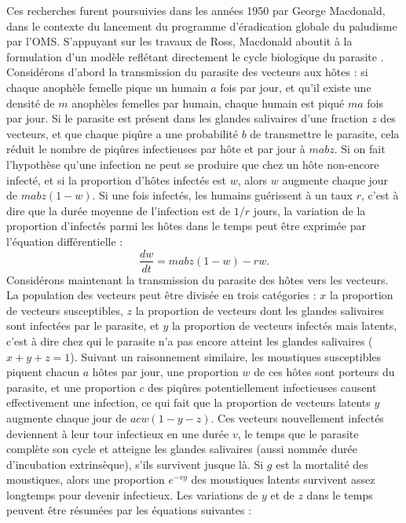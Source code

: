 Ces recherches furent poursuivies dans les années 1950 par George Macdonald, dans le contexte du lancement du programme d'éradication globale du paludisme par l'OMS.
S'appuyant sur les travaux de Ross, Macdonald aboutit à la formulation d'un modèle reflétant directement le cycle biologique du parasite \cite{macdonald1952analysis,koella1991use}.
Considérons d'abord la transmission du parasite des vecteurs aux hôtes : si chaque anophèle femelle pique un humain $a$ fois par jour, et qu'il existe une densité de $m$ anophèles femelles par humain, chaque humain est piqué $ma$ fois par jour.
Si le parasite est présent dans les glandes salivaires d'une fraction $z$ des vecteurs, et que chaque piqûre a une probabilité $b$ de transmettre le parasite, cela réduit le nombre de piqûres infectieuses par hôte et par jour à $mabz$.
Si on fait l'hypothèse qu'une infection ne peut se produire que chez un hôte non-encore infecté, et si la proportion d'hôtes infectés est $w$, alors $w$ augmente chaque jour de $mabz(1-w)$.
Si une fois infectés, les humains guérissent à un taux $r$, c'est à dire que la durée moyenne de l'infection est de $1/r$ jours, la variation de la proportion d'infectés parmi les hôtes dans le temps peut être exprimée par l'équation différentielle :
\begin{equation}
\label{eq:eqRM1}
\frac{dw}{dt} = mabz(1-w) - rw.
\end{equation}
Considérons maintenant la transmission du parasite des hôtes vers les vecteurs.
La population des vecteurs peut être divisée en trois catégories : $x$ la proportion de vecteurs susceptibles, $z$ la proportion de vecteurs dont les glandes salivaires sont infectées par le parasite, et $y$ la proportion de vecteurs infectés mais latents, c'est à dire chez qui le parasite n'a pas encore atteint les glandes salivaires ($x+y+z=1$).
Suivant un raisonnement similaire, les moustiques susceptibles piquent chacun $a$ hôtes par jour, une proportion $w$ de ces hôtes sont porteurs du parasite, et une proportion $c$ des piqûres potentiellement infectieuses causent effectivement une infection, ce qui fait que la proportion de vecteurs latents $y$ augmente chaque jour de $acw(1-y-z)$.
Ces vecteurs nouvellement infectés deviennent à leur tour infectieux en une durée $v$, le temps que le parasite complète son cycle et atteigne les glandes salivaires (aussi nommée durée d'incubation extrinsèque), s'ils survivent jusque là.
Si $g$ est la mortalité des moustiques, alors une proportion $e^{-vg}$ des moustiques latents survivent assez longtemps pour devenir infectieux.
Les variations de $y$ et de $z$ dans le temps peuvent être résumées par les équations suivantes :
